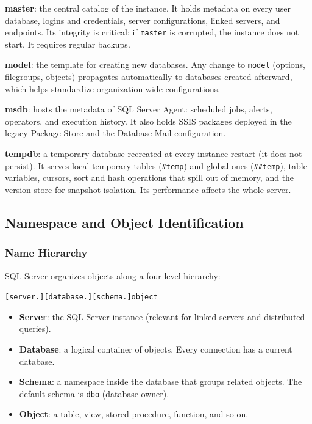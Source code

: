 \begin{examplebox}
\textbf{master}: the central catalog of the instance. It holds metadata on every user database, logins and credentials, server configurations, linked servers, and endpoints. Its integrity is critical: if \texttt{master} is corrupted, the instance does not start. It requires regular backups.

\textbf{model}: the template for creating new databases. Any change to \texttt{model} (options, filegroups, objects) propagates automatically to databases created afterward, which helps standardize organization-wide configurations.

\textbf{msdb}: hosts the metadata of SQL Server Agent: scheduled jobs, alerts, operators, and execution history. It also holds SSIS packages deployed in the legacy Package Store and the Database Mail configuration.

\textbf{tempdb}: a temporary database recreated at every instance restart (it does not persist). It serves local temporary tables (\texttt{\#temp}) and global ones (\texttt{\#\#temp}), table variables, cursors, sort and hash operations that spill out of memory, and the version store for snapshot isolation. Its performance affects the whole server.
\end{examplebox}

\subsection{Namespace and Object Identification}
\label{sec:sql-server-namespace}

\subsubsection{Name Hierarchy}
\label{subsec:naming-hierarchy}

SQL Server organizes objects along a four-level hierarchy:

\begin{center}
\texttt{[server.][database.][schema.]object}
\end{center}

\begin{itemize}
    \item \textbf{Server}: the SQL Server instance (relevant for linked servers and distributed queries).
    \item \textbf{Database}: a logical container of objects. Every connection has a current database.
    \item \textbf{Schema}: a namespace inside the database that groups related objects. The default schema is \texttt{dbo} (database owner).
    \item \textbf{Object}: a table, view, stored procedure, function, and so on.
\end{itemize}

